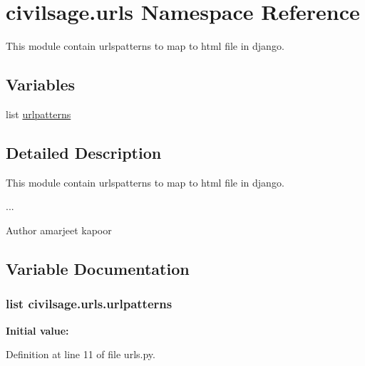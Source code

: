 \hypertarget{namespacecivilsage_1_1urls}{}\section{civilsage.\+urls Namespace Reference}
\label{namespacecivilsage_1_1urls}


This module contain urlspatterns to map to html file in django.  


\subsection*{Variables}
\begin{DoxyCompactItemize}
\item 
list \hyperlink{namespacecivilsage_1_1urls_a46a501661622e9e2b11c9d6da43bbec0}{urlpatterns}
\end{DoxyCompactItemize}


\subsection{Detailed Description}
This module contain urlspatterns to map to html file in django. 

... \begin{DoxyAuthor}{Author}
amarjeet kapoor 
\end{DoxyAuthor}


\subsection{Variable Documentation}
\hypertarget{namespacecivilsage_1_1urls_a46a501661622e9e2b11c9d6da43bbec0}{}
\subsubsection[{urlpatterns}]{\setlength{\rightskip}{0pt plus 5cm}list civilsage.\+urls.\+urlpatterns}\label{namespacecivilsage_1_1urls_a46a501661622e9e2b11c9d6da43bbec0}
{\bfseries Initial value\+:}


Definition at line 11 of file urls.\+py.

